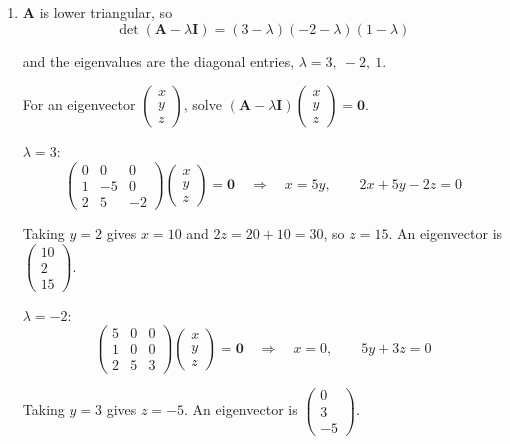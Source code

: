 \documentclass[leqno]{article}
\begin{document}
\begin{enumerate}[
  label=\textbf{\arabic*.},
  leftmargin=*,
  topsep=0pt,
  partopsep=0pt,
  parsep=0pt
]
\begin{djsSolution}
\begin{enumerate}[label=\textbf{(\alph*)}, start=1]
Also \(\mathbf{M}^{-1}\mathbf{e}\neq\mathbf{0}\): if \(\mathbf{M}^{-1}\mathbf{e}=\mathbf{0}\), then multiplying on the left by \(\mathbf{M}\) would give \(\mathbf{e}=\mathbf{M}\mathbf{0}=\mathbf{0}\), which is false. Hence \(\mathbf{M}^{-1}\mathbf{e}\) is an eigenvector of \(\mathbf{B}\) with corresponding eigenvalue \(\lambda\), as required.

  \item \(\mathbf{A}\) is lower triangular, so
\[
\det(\mathbf{A}-\lambda\mathbf{I})=(3-\lambda)(-2-\lambda)(1-\lambda)
\]

and the eigenvalues are the diagonal entries, \(\lambda=3,\ -2,\ 1\).

For an eigenvector \(\begin{pmatrix}x\\y\\z\end{pmatrix}\), solve \((\mathbf{A}-\lambda\mathbf{I})\begin{pmatrix}x\\y\\z\end{pmatrix}=\mathbf{0}\).

\(\lambda=3\):
\[
\begin{pmatrix}0&0&0\\1&-5&0\\2&5&-2\end{pmatrix}\begin{pmatrix}x\\y\\z\end{pmatrix}=\mathbf{0}\quad\Longrightarrow\quad x=5y,\qquad 2x+5y-2z=0
\]

Taking \(y=2\) gives \(x=10\) and \(2z=20+10=30\), so \(z=15\). An eigenvector is \(\begin{pmatrix}10\\2\\15\end{pmatrix}\).

\(\lambda=-2\):
\[
\begin{pmatrix}5&0&0\\1&0&0\\2&5&3\end{pmatrix}\begin{pmatrix}x\\y\\z\end{pmatrix}=\mathbf{0}\quad\Longrightarrow\quad x=0,\qquad 5y+3z=0
\]

Taking \(y=3\) gives \(z=-5\). An eigenvector is \(\begin{pmatrix}0\\3\\-5\end{pmatrix}\).


\end{enumerate}
\end{djsSolution}
\end{enumerate}
\end{document}
